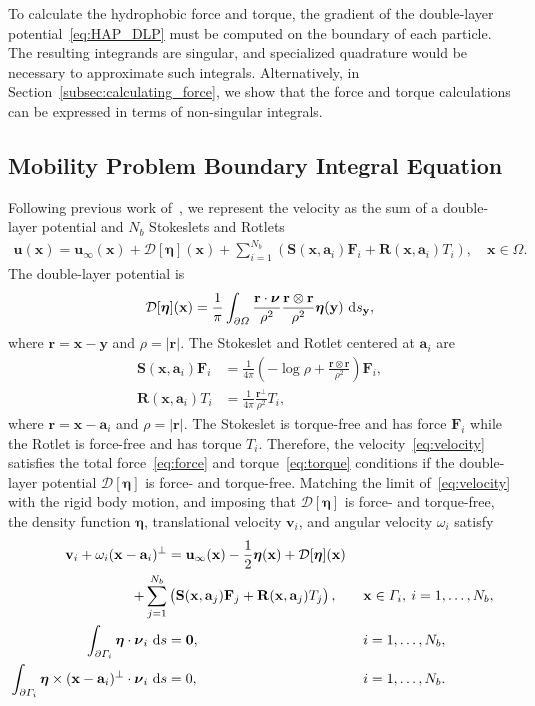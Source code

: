 \documentclass[lineno]{jfm}
\renewcommand{\aa}{\mathbf{a}}
\newcommand{\bd}{\partial}
\newcommand{\DD}{\mathcal{D}}
\newcommand{\eeta}{\boldsymbol{\eta}}
\newcommand{\FF}{\mathbf{F}}
\newcommand{\nnu}{\boldsymbol{\nu}}
\newcommand{\rr}{\mathbf{r}}
\newcommand{\RR}{\mathbf{R}}
\renewcommand{\SS}{\mathbf{S}}
\newcommand{\xx}{\mathbf{x}}
\newcommand{\uu}{\mathbf{u}}
\renewcommand{\vv}{\mathbf{v}}
\newcommand{\yy}{\mathbf{y}}
\begin{document}
To calculate the hydrophobic force and torque, the gradient of the
double-layer potential~\eqref{eq:HAP_DLP} must be computed on the
boundary of each particle. The resulting integrands are singular, and
specialized quadrature would be necessary to approximate such integrals.
Alternatively, in Section~\ref{subsec:calculating_force}, we show that
the force and torque calculations can be expressed in terms of
non-singular integrals.

\subsection{Mobility Problem Boundary Integral Equation}
Following previous work of~\cite{Lukas19}, we represent the velocity as
the sum of a double-layer potential and $N_b$ Stokeslets and Rotlets
\begin{align}
  \label{eq:velocity}
  \uu(\xx) = \uu_\infty(\xx) + \DD[\eeta](\xx) + 
    \sum_{i=1}^{N_b} \left(\SS(\xx,\aa_i) \FF_i + 
    \RR(\xx,\aa_i) T_i\right), \quad \xx \in \Omega.
\end{align}
The double-layer potential is
\begin{align}
  \DD[\eeta](\xx) = \frac{1}{\pi} \int_{\bd\Omega} 
    \frac{\rr \cdot \nnu}{\rho^2} \frac{\rr \otimes \rr}{\rho^2}
    \eeta(\yy) \, \dif s_\yy,
\end{align}
where $\rr = \xx - \yy$ and $\rho = |\rr|$. The Stokeslet and Rotlet
centered at $\aa_i$ are
\begin{align}
  \SS(\xx,\aa_i)\FF_i &= \frac{1}{4\pi} \left(-\log \rho + 
    \frac{\rr \otimes \rr}{\rho^2}\right) \FF_i, \\
  \RR(\xx,\aa_i)T_i &= \frac{1}{4\pi} \frac{\rr^\perp}{\rho^2} T_i,
\end{align}
where $\rr = \xx - \aa_i$ and $\rho = |\rr|$. The Stokeslet is
torque-free and has force $\FF_i$ while the Rotlet is force-free and has
torque $T_i$. Therefore, the velocity~\eqref{eq:velocity} satisfies the
total force~\eqref{eq:force} and torque~\eqref{eq:torque} conditions
if the double-layer potential $\DD[\eeta]$ is force- and torque-free.
Matching the limit of~\eqref{eq:velocity} with the rigid body motion,
and imposing that $\DD[\eeta]$ is force- and torque-free, the density
function $\eeta$, translational velocity $\vv_i$, and angular velocity
$\omega_i$ satisfy
\begin{alignat}{3}
  \nonumber
  \vv_i + \omega_i (\xx - \aa_i)^\perp &= \uu_\infty(\xx)
    -\frac{1}{2} \eeta(\xx) + \DD[\eeta](\xx) \\
  \label{eq:SKIE}
    + \sum_{j=1}^{N_b} &
    \left(\SS(\xx,\aa_j) \FF_j + \RR(\xx,\aa_j) T_j\right),
    \quad &&\xx \in \Gamma_i,\: i=1,\ldots,N_b, \\
  \label{eq:mobility1}
  \int_{\bd\Gamma_i} \eeta \cdot \nnu_i \, \dif s &= {\bf 0}, 
  &&i = 1,\ldots,N_b, \\
  \label{eq:mobility2}
  \int_{\bd\Gamma_i} \eeta\times(\xx-\aa_i)^\perp \cdot \nnu_i \, \dif s &= 0,
  &&i = 1,\ldots,N_b.
\end{alignat}
\end{document}
